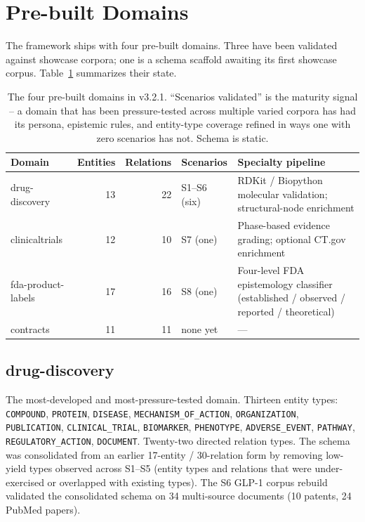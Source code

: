 \section{Pre-built Domains}
\label{sec:domains}

The framework ships with four pre-built domains. Three have been validated against showcase corpora; one is a schema scaffold awaiting its first showcase corpus. Table~\ref{tab:domains} summarizes their state.

\begin{table}[t]
\centering
\small
\caption{The four pre-built domains in v3.2.1. ``Scenarios validated'' is the maturity signal -- a domain that has been pressure-tested across multiple varied corpora has had its persona, epistemic rules, and entity-type coverage refined in ways one with zero scenarios has not. Schema is static.}
\label{tab:domains}
\begin{tabular}{@{}lrrlp{4.5cm}@{}}
\toprule
\textbf{Domain} & \textbf{Entities} & \textbf{Relations} & \textbf{Scenarios} & \textbf{Specialty pipeline} \\
\midrule
drug-discovery       & 13 & 22 & S1--S6 (six)   & RDKit / Biopython molecular validation; structural-node enrichment \\
clinicaltrials       & 12 & 10 & S7 (one)       & Phase-based evidence grading; optional CT.gov enrichment \\
fda-product-labels   & 17 & 16 & S8 (one)       & Four-level FDA epistemology classifier (established / observed / reported / theoretical) \\
contracts            & 11 & 11 & none yet       & --- \\
\bottomrule
\end{tabular}
\end{table}

\subsection{drug-discovery}
\label{sec:domain-drug-discovery}

The most-developed and most-pressure-tested domain. Thirteen entity types: \texttt{COMPOUND}, \texttt{PROTEIN}, \texttt{DISEASE}, \texttt{MECHANISM\_OF\_ACTION}, \texttt{ORGANIZATION}, \texttt{PUBLICATION}, \texttt{CLINICAL\_TRIAL}, \texttt{BIOMARKER}, \texttt{PHENOTYPE}, \texttt{ADVERSE\_EVENT}, \texttt{PATHWAY}, \texttt{REGULATORY\_ACTION}, \texttt{DOCUMENT}. Twenty-two directed relation types. The schema was consolidated from an earlier 17-entity / 30-relation form by removing low-yield types observed across S1--S5 (entity types and relations that were under-exercised or overlapped with existing types). The S6 GLP-1 corpus rebuild validated the consolidated schema on 34 multi-source documents (10 patents, 24 PubMed papers).

